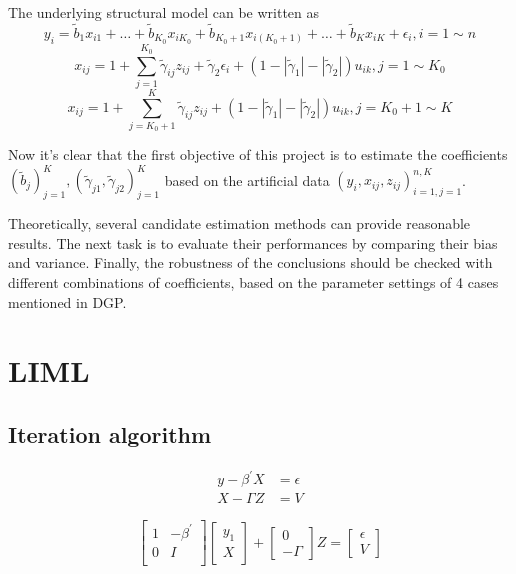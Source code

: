 \documentclass[12pt,pdftex,letterpaper]{article}
\begin{document}
    The underlying structural model can be written as
    $$y_{i}=\tilde{b}_{1}x_{i1}+\dots+\tilde{b}_{K_{0}}x_{iK_{0}}+\tilde{b}_{K_{0}+1}x_{i(K_{0}+1)}+\dots+\tilde{b}_{K}x_{iK}+\epsilon_{i}, i=1 \sim n$$
    $$x_{ij}=1+\sum_{j=1}^{K_{0}}\tilde{\gamma}_{ij}z_{ij}+\tilde{\gamma}_{2}\epsilon_{i}+(1-|\tilde{\gamma}_{1}|-|\tilde{\gamma}_{2}|)u_{ik},j=1\sim K_{0}$$
    $$x_{ij}=1+\sum_{j=K_{0}+1}^{K}\tilde{\gamma}_{ij}z_{ij}+(1-|\tilde{\gamma}_{1}|-|\tilde{\gamma}_{2}|)u_{ik},j=K_{0}+1 \sim K$$ 
    
    Now it's clear that the first objective of this project is to estimate the coefficients $(\tilde{b}_{j})_{j=1}^{K},(\tilde{\gamma}_{j1},\tilde{\gamma}_{j2})_{j=1}^{K}$ based on the artificial data $(y_{i},x_{ij},z_{ij})_{i=1,j=1}^{n,K}$.
    
    Theoretically, several candidate estimation methods can provide reasonable results. The next task is to evaluate their performances by comparing their bias and variance. Finally, the robustness of the conclusions should be checked with different combinations of coefficients, based on the parameter settings of 4 cases mentioned in DGP.

      
\section{LIML}
\subsection{Iteration algorithm}
\begin{align*}
y-\beta^{'}X & =\epsilon\\
X-\Gamma Z & = V 
\end{align*}

\begin{equation}
\begin{bmatrix}
 1 & -\beta^{'} \\
 0  &     I  \\
\end{bmatrix}
\begin{bmatrix}
y_{1} \\
X
\end{bmatrix}
+
\begin{bmatrix}
0 \\
-\Gamma 
\end{bmatrix}
Z
=
\begin{bmatrix}
\epsilon \\
V
\end{bmatrix}
\end{equation}
\end{document}
